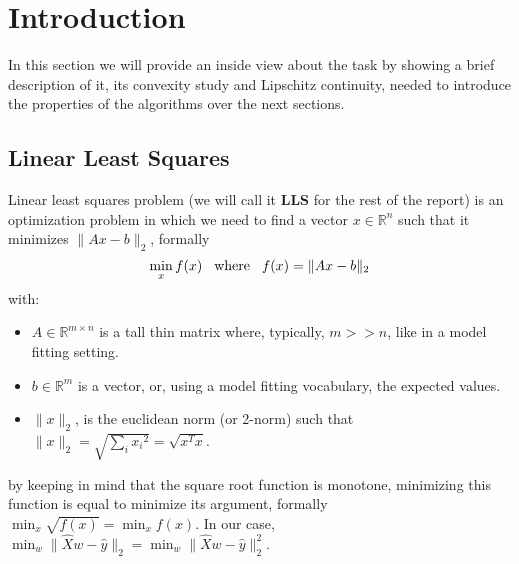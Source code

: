 \section{Introduction}
In this section we will provide an inside view about the task by showing a brief description of it, its convexity study and Lipschitz continuity, needed to introduce the properties of the algorithms over the next sections.

\subsection{Linear Least Squares}\label{subsec:introduction_lls}
Linear least squares problem (we will call it \textbf{LLS} for the rest of the report) is an optimization problem in which we need to find a vector $x\in \mathbb{R}^n$ such that it minimizes $\lVert Ax-b\rVert_2$, formally
\begin{equation}
\displaystyle \min_{x}f(x) \hspace{3mm} \text{where} \hspace{3mm}f(x)=\lVert Ax-b\rVert_2
\end{equation}
with:
\begin{itemize}
    \item $A \in \mathbb{R}^{m\times n}$ is a tall thin matrix where, typically, $m>>n$, like in a model fitting setting.
    \item $b \in \mathbb{R}^m$ is a vector, or, using a model fitting vocabulary, the expected values.
    \item $\lVert x \rVert_2$, is the euclidean norm (or 2-norm) such that $\lVert x \rVert_2=\sqrt{\sum_{i}{x_{i}}^2}=\sqrt{x^Tx}$.
\end{itemize}
by keeping in mind that the square root function is monotone, minimizing this function is equal to minimize its argument, formally $\displaystyle \min_x \sqrt{f(x)}=\min_x f(x)$. In our case, $\displaystyle \min_{w} \lVert \hat{X}w - \hat{y} \rVert_2=\min_{w} \lVert \hat{X}w-\hat{y} \rVert_2 ^2$.
\vspace{3mm}

